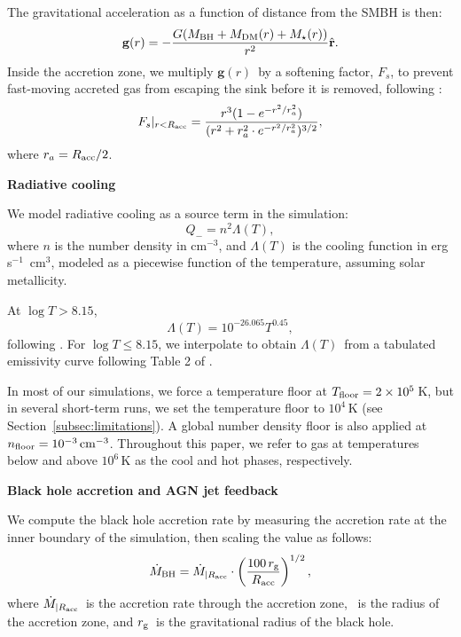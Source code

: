 The gravitational acceleration as a function of distance from the SMBH is then:
\begin{equation}
\label{eq:gacc}
    \mathbf{g}(r) = - \frac{G(M_{\rm BH} + M_{\rm DM}(r) + M_{\star}(r))}{r^2} \hat{\mathbf{r}}.
\end{equation}
Inside the accretion zone, we multiply $\mathbf{g}(r)$\ by a softening factor, $F_s$, to prevent fast-moving accreted gas from escaping the sink before it is removed,
following \citet{guo_toward_2023}:
\begin{equation}
    F_s|_{r < R_{\rm acc}} = \frac{r^3 (1-e^{-r^{2}/r_{a}^2})}{(r^2 + r_{a}^2 \cdot e^{-r^{2}/r_{a}^2})^{3/2}},
\end{equation}
where $r_{a} = R_{\rm acc}/2$.

\centerline{\textbf{Radiative cooling}}

We model radiative cooling as a source term in the simulation:
\begin{equation}
    Q_{-} = n^2\Lambda(T),
\end{equation}
where $n$ is the number density in cm$^{-3}$, and $\Lambda(T)$ is the cooling function in erg s$^{-1}$~cm$^3$, modeled as a piecewise function of the temperature, assuming solar metallicity.

At $\log T > 8.15$,
\begin{equation}
    \Lambda(T) = 10^{-26.065}T^{0.45},
\end{equation}
following \citet{schneider_introducing_2018}.
For $\log T \leq 8.15$, we interpolate to obtain $\Lambda(T)$~from a tabulated emissivity curve following Table 2 of \citet{schure_new_2009}.

In most of our simulations, we force a temperature floor at $T_{\rm floor}=2\times10^5$\,K, but in several short-term runs, we set the temperature floor to $10^4$\,K (see Section~\ref{subsec:limitations}).
A global number density floor is also applied at $n_{\rm floor} =10^{-3}\,\mathrm{cm^{-3}}$.
Throughout this paper, we refer to gas at temperatures below and above $10^6$\,K as the cool and hot phases, respectively.

\centerline{\textbf{Black hole accretion and AGN jet feedback}}
\label{subsubsec:jet}

We compute the black hole accretion rate by measuring the accretion rate at the inner boundary of the simulation, then scaling the value as follows:
\begin{equation}
\label{eq:scaling}
    \dot{M}_{\rm BH} = \dot{M}_{|R_{\rm acc}} \cdot \left(\frac{100\,r_{\rm g}}{R_{\rm acc}}\right)^{1/2},
\end{equation}
where $\dot{M}_{|R_{\rm acc}}$\ is the accretion rate through the accretion zone, \racc\ is the radius of the accretion zone, and $r_{\rm g}$\ is the gravitational radius of the black hole.

